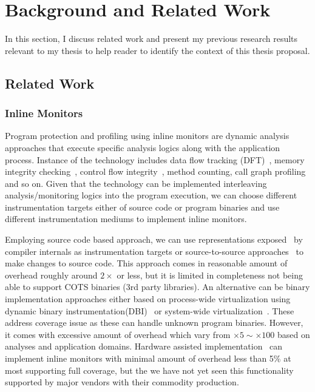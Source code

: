 \section{Background and Related Work}
\label{sec:related}

In this section, I discuss related work and present my previous research
results relevant to my thesis to help reader to identify the context of this
thesis proposal.

\subsection{Related Work}

\subsubsection{Inline Monitors}
\label{ssec:inline}

Program protection and profiling using inline monitors are dynamic analysis
approaches that execute specific analysis logics along with the application
process. Instance of the technology includes data flow tracking
(DFT)~\cite{DFT}, memory integrity checking~\cite{memcheck}, control flow
integrity~\cite{cfi}, method counting, call graph profiling and so on.
Given that the technology can be implemented interleaving analysis/monitoring
logics into the program execution, we can choose different instrumentation
targets either of source code or program binaries and use different
instrumentation mediums to implement inline monitors.

Employing source code based approach, we can use representations
exposed~\cite{AST,LLVM-IR} by compiler internals as instrumentation targets or
source-to-source approaches~\cite{txl, cil} to make changes to source code.
This approach comes in reasonable amount of overhead roughly around $2\times$
or less, but it is limited in completeness not being able to support COTS
binaries (\ie 3rd party libraries).  An alternative can be binary
implementation approaches either based on process-wide virtualization using
dynamic binary instrumentation(DBI)~\cite{PIN, dynamoRIO, valgrind} or
system-wide virtualization~\cite{qemu,xen}. These address coverage issue as
these can handle unknown program binaries. However, it comes with excessive
amount of overhead which vary from $\times 5 \sim \times 100$ based on analyses
and application domains. Hardware assisted implementation~\cite{HARD, lba} can
implement inline monitors with minimal amount of overhead less than 5\% at most
supporting full coverage, but the we have not yet seen this functionality
supported by major vendors with their commodity production.

